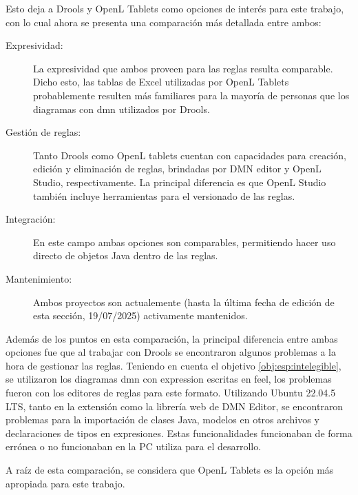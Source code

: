 Esto deja a Drools y OpenL Tablets como opciones de interés para este trabajo, con lo cual ahora se presenta una comparación más detallada entre ambos:

\begin{description}
    \item[Expresividad:] La expresividad que ambos proveen para las reglas resulta comparable. Dicho esto, las tablas de Excel utilizadas por OpenL Tablets probablemente resulten más familiares para la mayoría de personas que los diagramas con \acrfull{dmn} utilizados por Drools.
    \item[Gestión de reglas:] Tanto Drools como OpenL tablets cuentan con capacidades para creación, edición y eliminación de reglas, brindadas por DMN editor y OpenL Studio, respectivamente. La principal diferencia es que OpenL Studio también incluye herramientas para el versionado de las reglas.
    \item[Integración:] En este campo ambas opciones son comparables, permitiendo hacer uso directo de objetos Java dentro de las reglas.
    \item[Mantenimiento:] Ambos proyectos son actualemente (hasta la última fecha de edición de esta sección, 19/07/2025) activamente mantenidos.
\end{description}

Además de los puntos en esta comparación, la principal diferencia entre ambas opciones fue que al trabajar con Drools se encontraron algunos problemas a la hora de gestionar las reglas. Teniendo en cuenta el objetivo \ref{obj:esp:intelegible}, se utilizaron los diagramas \acrshort{dmn} con expression escritas en \acrfull{feel}, los problemas fueron con los editores de reglas para este formato.
Utilizando Ubuntu 22.04.5 LTS, tanto en la extensión como la librería web de DMN Editor, se encontraron problemas para la importación de clases Java, modelos en otros archivos y declaraciones de tipos en expresiones. Estas funcionalidades funcionaban de forma errónea o no funcionaban en la PC utiliza para el desarrollo.

A raíz de esta comparación, se considera que OpenL Tablets es la opción más apropiada para este trabajo.
